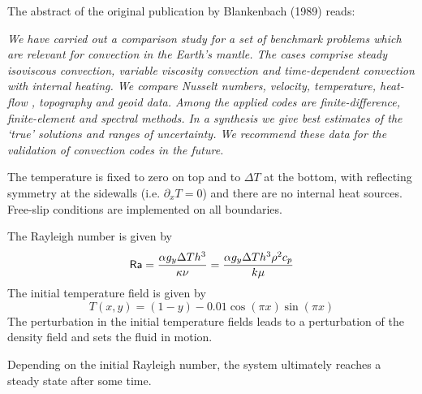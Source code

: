 
The abstract of the original publication by Blankenbach \etal (1989) \cite{blbc89} reads:
\begin{center}
{\it 
We have carried out a comparison study for a set of benchmark problems 
which are relevant for convection in the Earth's mantle. The cases comprise 
steady isoviscous convection, variable viscosity convection and time-dependent 
convection with internal heating. We compare Nusselt numbers, velocity, 
temperature, heat-flow , topography and geoid data. Among the applied codes 
are finite-difference, finite-element and spectral methods. In a synthesis 
we give best estimates of the `true' solutions and ranges of uncertainty. We
recommend these data for the validation of convection codes in the future.
}
\end{center}

The temperature is fixed to zero on top and to $\Delta T$ at the bottom, 
with reflecting symmetry at the sidewalls (i.e. $\partial_x T=0$) 
and there are no internal heat sources. 
Free-slip conditions are implemented on all boundaries. 

The Rayleigh number is given by
\[
{\mathsf{Ra}} = \frac{\alpha g_y \Delta T h^3 }{\kappa \nu}
=\frac{\alpha g_y \Delta T h^3 \rho^2 c_p}{k \mu}
\]
The initial temperature field is given by 
\[
T(x,y)=(1-y) - 0.01\cos(\pi x) \sin(\pi x)
\]
The perturbation in the initial temperature fields leads to 
a perturbation of the density field and sets the fluid in motion. 

Depending on the initial Rayleigh number, the system ultimately reaches a 
steady state after some time. 

